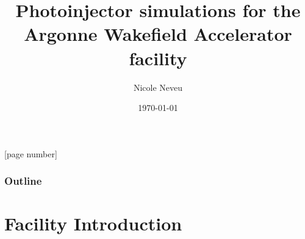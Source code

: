 \documentclass{beamer}
\title[PSI Talk]{Photoinjector simulations for the Argonne Wakefield Accelerator facility}
\author[Speaker]{Nicole Neveu}
\subtitle{}
\institute[ANL/IIT]{Argonne National Laboratory\\Illinois Institute of Technology}
\date{\today}
\begin{document}
{
	\frame{\titlepage}
}

[page number]{}	
	
\begin{frame}
  \frametitle{Outline}
  \tableofcontents
\end{frame}
\section{Facility Introduction}
\end{document}
